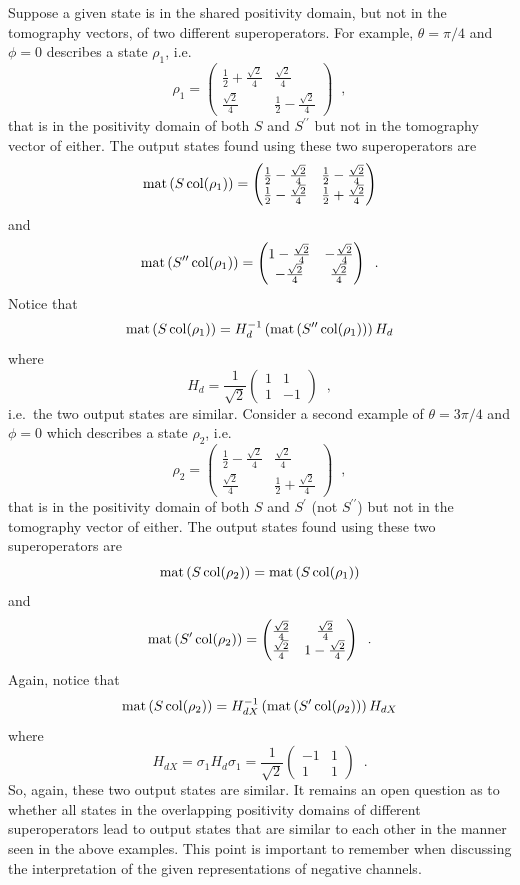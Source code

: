 Suppose a given state is in the shared positivity domain, but not in the tomography vectors, of two different superoperators.  For example, $\theta=\pi/4$ and $\phi=0$ describes a state $\rho_1$, i.e.\
$$
\rho_1 = \begin{pmatrix}
\frac{1}{2}+\frac{\sqrt{2}}{4}&\frac{\sqrt{2}}{4}\\
\frac{\sqrt{2}}{4}&\frac{1}{2}-\frac{\sqrt{2}}{4}
\end{pmatrix}\;\;,
$$
that is in the positivity domain of both $S$ and $S^{\prime\prime}$ but not in the tomography vector of either.  The output states found using these two superoperators are
$$
\operatorname{mat}\left(S\operatorname{col}(\rho_1)\right) = \begin{pmatrix}
\frac{1}{2}-\frac{\sqrt{2}}{4}& \frac{1}{2}-\frac{\sqrt{2}}{4}\\
\frac{1}{2}-\frac{\sqrt{2}}{4}& \frac{1}{2}+\frac{\sqrt{2}}{4}
\end{pmatrix}
$$
and
$$
\operatorname{mat}\left(S^{\prime\prime}\operatorname{col}(\rho_1)\right) = \begin{pmatrix}
1-\frac{\sqrt{2}}{4}& -\frac{\sqrt{2}}{4}\\
-\frac{\sqrt{2}}{4}& \frac{\sqrt{2}}{4}
\end{pmatrix}\;\;.
$$
Notice that 
$$
\operatorname{mat}\left(S\operatorname{col}(\rho_1)\right)=H_d^{-1}\left(\operatorname{mat}\left(S^{\prime\prime}\operatorname{col}(\rho_1)\right)\right)H_d
$$
where
$$
H_d = \frac{1}{\sqrt{2}}\begin{pmatrix}1&1\\1&-1\end{pmatrix}\;\;,
$$
i.e.\ the two output states are similar.  Consider a second example of $\theta=3\pi/4$ and $\phi=0$ which describes a state $\rho_2$, i.e.\
$$
\rho_2 = \begin{pmatrix}
\frac{1}{2}-\frac{\sqrt{2}}{4}&\frac{\sqrt{2}}{4}\\
\frac{\sqrt{2}}{4}&\frac{1}{2}+\frac{\sqrt{2}}{4}
\end{pmatrix}\;\;,
$$
that is in the positivity domain of both $S$ and $S^{\prime}$ (not $S^{\prime\prime}$) but not in the tomography vector of either.  The output states found using these two superoperators are
$$
\operatorname{mat}\left(S\operatorname{col}(\rho_2)\right) = \operatorname{mat}\left(S\operatorname{col}(\rho_1)\right)
$$
and
$$
\operatorname{mat}\left(S^{\prime}\operatorname{col}(\rho_2)\right) = \begin{pmatrix}
\frac{\sqrt{2}}{4}& \frac{\sqrt{2}}{4}\\
\frac{\sqrt{2}}{4}& 1-\frac{\sqrt{2}}{4}
\end{pmatrix}\;\;.
$$
Again, notice that 
$$
\operatorname{mat}\left(S\operatorname{col}(\rho_2)\right)=H_{dX}^{-1}\left(\operatorname{mat}\left(S^{\prime}\operatorname{col}(\rho_2)\right)\right)H_{dX}
$$
where
$$
H_{dX} = \sigma_1H_d\sigma_1 = \frac{1}{\sqrt{2}}\begin{pmatrix}-1&1\\1&1\end{pmatrix}\;\;.
$$
So, again, these two output states are similar.  It remains an open question as to whether all states in the overlapping positivity domains of different superoperators lead to output states that are similar to each other in the manner seen in the above examples.  This point is important to remember when discussing the interpretation of the given representations of negative channels.  

